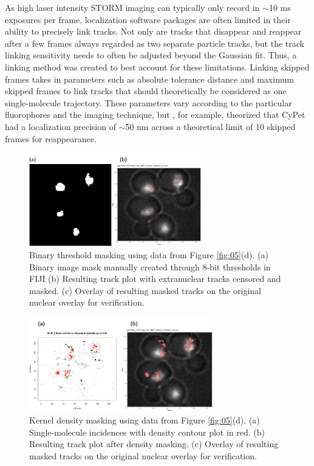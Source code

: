 \documentclass{bioinfo}
\begin{document}
As high laser intensity STORM imaging can typically only record in $\sim$10 ms exposures per frame, localization software packages are often limited in their ability to precisely link tracks. Not only are tracks that disappear and reappear after a few frames always regarded as two separate particle tracks, but the track linking sensitivity needs to often be adjusted beyond the Gaussian fit. Thus, a linking method was created to best account for these limitations. Linking skipped frames takes in parameters such as absolute tolerance distance and maximum skipped frames to link tracks that should theoretically be considered as one single-molecule trajectory. These parameters vary according to the particular fluorophores and the imaging technique, but \citealp{Plank}, for example, theorized that CyPet had a localization precision of $\sim$50 nm across a theoretical limit of 10 skipped frames for reappearance.

\begin{figure}[!tpb]
\centerline{\includegraphics[width=75mm]{mask1.png}}
\caption{Binary threshold masking using data from Figure \ref{fig:05}(d). (a) Binary image mask manually created through 8-bit thresholds in FIJI (b) Resulting track plot with extranuclear tracks censored and masked. (c) Overlay of resulting masked tracks on the original nuclear overlay for verification.}\label{fig:06}
\end{figure}

\begin{figure}[!tpb]
\centerline{\includegraphics[width=80mm]{mask2.png}}
\caption{Kernel density masking using data from Figure \ref{fig:05}(d). (a) Single-molecule incidences with density contour plot in red. (b) Resulting track plot after density masking. (c) Overlay of resulting masked tracks on the original nuclear overlay for verification.}\label{fig:07}
\end{figure}
\end{document}
